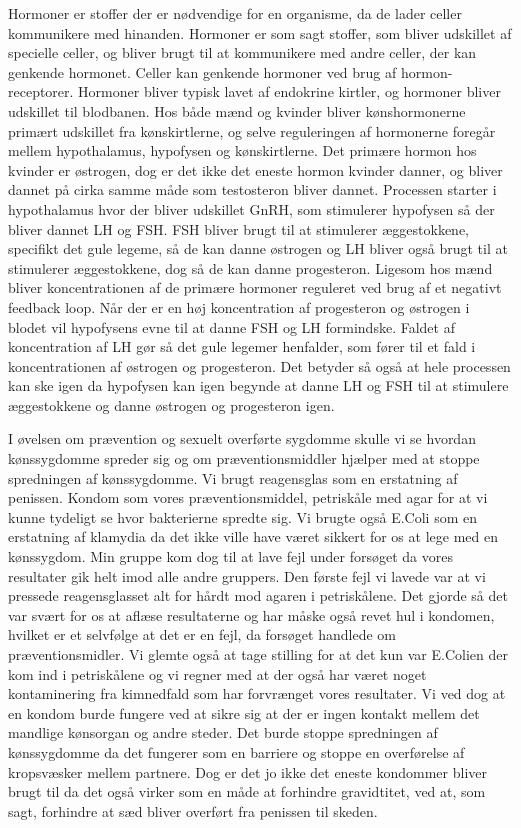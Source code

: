 Hormoner er stoffer der er nødvendige for en organisme, da de lader celler kommunikere med hinanden. Hormoner er som sagt stoffer, som bliver udskillet af specielle celler, og bliver brugt til at kommunikere med andre celler, der kan genkende hormonet. Celler kan genkende hormoner ved brug af hormon-receptorer. Hormoner bliver typisk lavet af endokrine kirtler, og hormoner bliver udskillet til blodbanen. Hos både mænd og kvinder bliver kønshormonerne primært udskillet fra kønskirtlerne, og selve reguleringen af hormonerne foregår mellem hypothalamus, hypofysen og kønskirtlerne. 
Det primære hormon hos kvinder er østrogen, dog er det ikke det eneste hormon kvinder danner, og bliver dannet på cirka samme måde som testosteron bliver dannet. Processen starter i hypothalamus hvor der bliver udskillet GnRH, som stimulerer hypofysen så der bliver dannet LH og FSH. FSH bliver brugt til at stimulerer æggestokkene, specifikt det gule legeme, så de kan danne østrogen og LH bliver også brugt til at stimulerer æggestokkene, dog så de kan danne progesteron. Ligesom hos mænd bliver koncentrationen af de primære hormoner reguleret ved brug af et negativt feedback loop. Når der er en høj koncentration af progesteron og østrogen i blodet vil hypofysens evne til at danne FSH og LH formindske. Faldet af koncentration af LH gør så det gule legemer henfalder, som fører til et fald i koncentrationen af østrogen og progesteron. Det betyder så også at hele processen kan ske igen da hypofysen kan igen begynde at danne LH og FSH til at stimulere æggestokkene og danne østrogen og progesteron igen.

I øvelsen om prævention og sexuelt overførte sygdomme skulle vi se hvordan kønssygdomme spreder sig og om præventionsmiddler hjælper med at stoppe spredningen af kønssygdomme. Vi brugt reagensglas som en erstatning af penissen. Kondom som vores præventionsmiddel, petriskåle med agar for at vi kunne tydeligt se hvor bakterierne spredte sig. Vi brugte også E.Coli som en erstatning af klamydia da det ikke ville have været sikkert for os at lege med en kønssygdom. Min gruppe kom dog til at lave fejl under forsøget da vores resultater gik helt imod alle andre gruppers. Den første fejl vi lavede var at vi pressede reagensglasset alt for hårdt mod agaren i petriskålene. Det gjorde så det var svært for os at aflæse resultaterne og har måske også revet hul i kondomen, hvilket er et selvfølge at det er en fejl, da forsøget handlede om præventionsmidler. Vi glemte også at tage stilling for at det kun var E.Colien der kom ind i petriskålene og vi regner med at der også har været noget kontaminering fra kimnedfald som har forvrænget vores resultater. 
Vi ved dog at en kondom burde fungere ved at sikre sig at der er ingen kontakt mellem det mandlige kønsorgan og andre steder. Det burde stoppe spredningen af kønssygdomme da det fungerer som en barriere og stoppe en overførelse af kropsvæsker mellem partnere. Dog er det jo ikke det eneste kondommer bliver brugt til da det også virker som en måde at forhindre gravidtitet, ved at, som sagt, forhindre at sæd bliver overført fra penissen til skeden.

